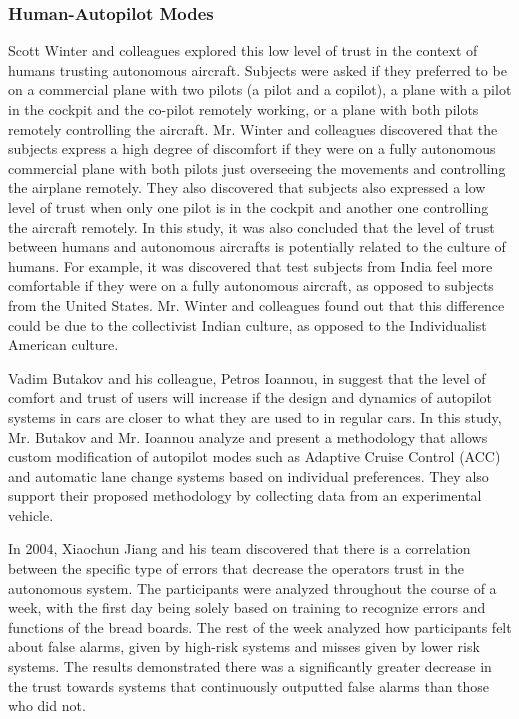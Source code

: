 \documentclass[runningheads,a4paper]{llncs}
\begin{document}
\subsubsection{Human-Autopilot Modes}
Scott Winter and colleagues \cite{winter2015indian} explored this low level of trust in the context of humans trusting autonomous aircraft. Subjects were asked if they preferred to be on a commercial plane with two pilots (a pilot and a copilot), a plane with a pilot in the cockpit and the co-pilot remotely working, or a plane with both pilots remotely controlling the aircraft. Mr. Winter and colleagues discovered that the subjects express a high degree of discomfort if they were on a fully autonomous commercial plane with both pilots just overseeing the movements and controlling the airplane remotely. They also discovered that subjects also expressed a low level of trust when only one pilot is in the cockpit and another one controlling the aircraft remotely. In this study, it was also concluded that the level of trust between humans and autonomous aircrafts is potentially related to the culture of humans. For example, it was discovered that test subjects from India feel more comfortable if they were on a fully autonomous aircraft, as opposed to subjects from the United States. Mr. Winter and colleagues found out that this difference could be due to the collectivist Indian culture, as opposed to the Individualist American culture.

Vadim Butakov and his colleague, Petros Ioannou, in \cite{butakov2015driving} suggest that the level of comfort and trust of users will increase if the design and dynamics of autopilot systems in cars are closer to what they are used to in regular cars. In this study, Mr. Butakov and Mr. Ioannou analyze and present a methodology that allows custom modification of autopilot modes such as  Adaptive Cruise Control (ACC) and automatic lane change systems based on individual preferences. They also support their proposed methodology by collecting data from an experimental vehicle.

In 2004, Xiaochun Jiang and his team discovered that there is a correlation between the specific type of errors that decrease the operators trust in the autonomous system\cite{jiang2004measurement}.  The participants were analyzed throughout the course of a week, with the first day being solely based on training to recognize errors and functions of the bread boards.  The rest of the week analyzed how participants felt about false alarms, given by high-risk systems and misses given by lower risk systems. The results demonstrated there was a significantly greater decrease in the trust towards systems that continuously outputted false alarms than those who did not.
\end{document}

